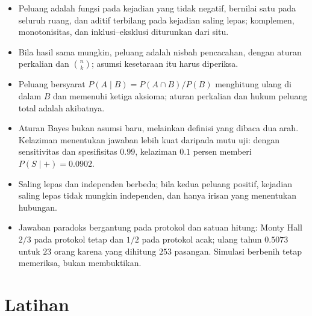 \begin{ringkasan}
\begin{itemize}
  \item Peluang adalah fungsi pada kejadian yang tidak negatif, bernilai satu pada
        seluruh ruang, dan aditif terbilang pada kejadian saling lepas; komplemen,
        monotonisitas, dan inklusi--eksklusi diturunkan dari situ.
  \item Bila hasil sama mungkin, peluang adalah nisbah pencacahan, dengan aturan
        perkalian dan $\binom{n}{k}$; asumsi kesetaraan itu harus diperiksa.
  \item Peluang bersyarat $P(A\mid B)=P(A\cap B)/P(B)$ menghitung ulang di dalam $B$
        dan memenuhi ketiga aksioma; aturan perkalian dan hukum peluang total adalah
        akibatnya.
  \item Aturan Bayes bukan asumsi baru, melainkan definisi yang dibaca dua arah.
        Kelaziman menentukan jawaban lebih kuat daripada mutu uji: dengan sensitivitas
        dan spesifisitas $0.99$, kelaziman $0.1$ persen memberi $P(S\mid+)=0.0902$.
  \item Saling lepas dan independen berbeda; bila kedua peluang positif, kejadian
        saling lepas tidak mungkin independen, dan hanya irisan yang menentukan
        hubungan.
  \item Jawaban paradoks bergantung pada protokol dan satuan hitung: Monty Hall $2/3$
        pada protokol tetap dan $1/2$ pada protokol acak; ulang tahun $0.5073$ untuk
        $23$ orang karena yang dihitung $253$ pasangan. Simulasi berbenih tetap
        memeriksa, bukan membuktikan.
\end{itemize}
\end{ringkasan}

\section{Latihan}

